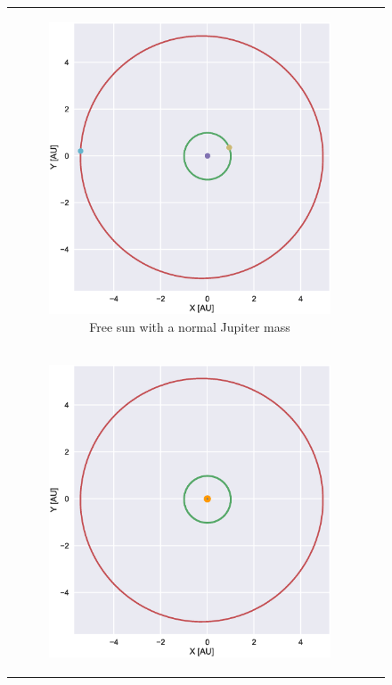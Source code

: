 \documentclass[aps,reprint]{revtex4-1}
\begin{document}
\begin{figure}
\begin{tabular}{cc}
\begin{subfigure}[b]{0.5\columnwidth}
        \includegraphics[width=\columnwidth]{figures/jupiter2_1.eps}
        \caption{Free sun with a normal Jupiter mass}
        \label{free1}
    \end{subfigure}\\
    \begin{subfigure}[b]{0.5\columnwidth}
      \includegraphics[width=\columnwidth]{figures/jupiter_10.eps}

\end{subfigure}
\end{tabular}
\end{figure}
\end{document}
